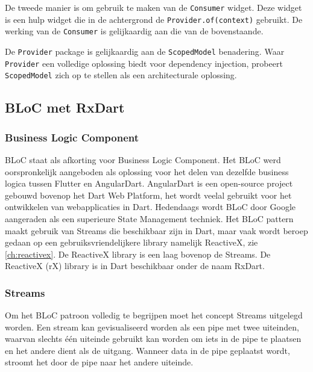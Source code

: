 De tweede manier is om gebruik te maken van de \verb|Consumer| widget. Deze widget is een hulp widget die in de achtergrond de \verb|Provider.of(context)| gebruikt. De werking van de \verb|Consumer| is gelijkaardig aan die van de bovenstaande. 

De \verb|Provider| package is gelijkaardig aan de \verb|ScopedModel| benadering. Waar \verb|Provider| een volledige oplossing biedt voor dependency injection, probeert \verb|ScopedModel| zich op te stellen als een architecturale oplossing.

\subsection{BLoC met RxDart}
\subsubsection{Business Logic Component}
BLoC staat als afkorting voor Business Logic Component. Het BLoC werd oorspronkelijk aangeboden als oplossing voor het delen van dezelfde business logica tussen Flutter en AngularDart. AngularDart is een open-source project gebouwd bovenop het Dart Web Platform, het wordt veelal gebruikt voor het ontwikkelen van webapplicaties in Dart. Hedendaags wordt BLoC door Google aangeraden als een superieure State Management techniek. Het BLoC pattern maakt gebruik van Streams die beschikbaar zijn in Dart, maar vaak wordt beroep gedaan op een gebruiksvriendelijkere library namelijk ReactiveX, zie \ref{ch:reactivex}. De ReactiveX library is een laag bovenop de Streams.
\newline \newline
De ReactiveX (rX) library is in Dart beschikbaar onder de naam RxDart.

\subsubsection{Streams}
Om het BLoC patroon volledig te begrijpen moet het concept Streams uitgelegd worden.
Een stream kan gevisualiseerd worden als een pipe met twee uiteinden, waarvan slechts
één uiteinde gebruikt kan worden om iets in de pipe te plaatsen en het andere dient als de uitgang. Wanneer data in de pipe
geplaatst wordt, stroomt het door de pipe naar het andere uiteinde. \autocite{Boelens2018}

